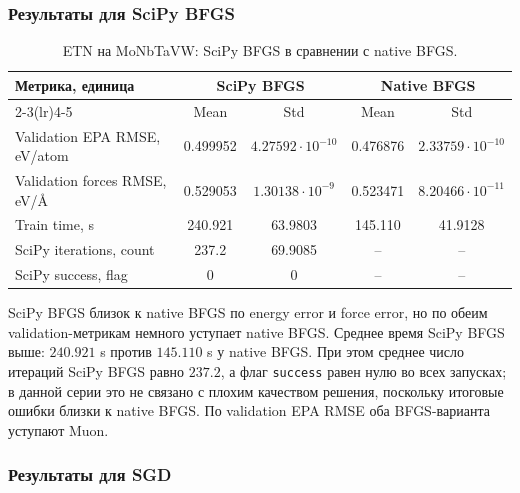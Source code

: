 \FloatBarrier

\subsubsection{Результаты для SciPy BFGS}

\begin{table}[H]
\centering
\small
\caption{ETN на MoNbTaVW: SciPy BFGS в сравнении с native BFGS.}
\label{tab:etn-monbtavw-scipy-bfgs}
\begin{tabular}{lcccc}
\toprule
\multirow{2}{*}{Метрика, единица} & \multicolumn{2}{c}{SciPy BFGS} & \multicolumn{2}{c}{Native BFGS} \\
\cmidrule(lr){2-3}\cmidrule(lr){4-5}
 & Mean & Std & Mean & Std \\
\midrule
Validation EPA RMSE, eV/atom & 0.499952 & \(4.27592\cdot 10^{-10}\) & 0.476876 & \(2.33759\cdot 10^{-10}\) \\
Validation forces RMSE, eV/\AA & 0.529053 & \(1.30138\cdot 10^{-9}\) & 0.523471 & \(8.20466\cdot 10^{-11}\) \\
Train time, s & 240.921 & 63.9803 & 145.110 & 41.9128 \\
SciPy iterations, count & 237.2 & 69.9085 & -- & -- \\
SciPy success, flag & 0 & 0 & -- & -- \\
\bottomrule
\end{tabular}
\end{table}


SciPy BFGS близок к native BFGS по energy error и force error, но по обеим validation-метрикам немного уступает native BFGS. Среднее время SciPy BFGS выше: \(240.921\) s против \(145.110\) s у native BFGS. При этом среднее число итераций SciPy BFGS равно \(237.2\), а флаг \texttt{success} равен нулю во всех запусках; в данной серии это не связано с плохим качеством решения, поскольку итоговые ошибки близки к native BFGS. По validation EPA RMSE оба BFGS-варианта уступают Muon.

\FloatBarrier

\subsubsection{Результаты для SGD}

